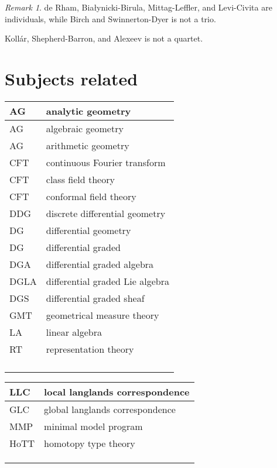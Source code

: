 \documentclass{amsart}
\numberwithin{equation}{section}
\theoremstyle{plain}
\numberwithin{equation}{section}
\theoremstyle{remark}
\newtheorem{remark}[theorem]{Remark}
\begin{document}
\begin{multicols}{2}
\unvbox\ltmcbox




\end{multicols}

\begin{remark}
de Rham, Bia\l{}ynicki-Birula, Mittag-Leffler, and Levi-Civita are individuals, while Birch and Swinnerton-Dyer is not a trio.

Koll\'{a}r, Shepherd-Barron, and Alexeev is not a quartet.
\end{remark}


\section{Subjects related}

\begin{longtable}{l|l}
\hline
AG & analytic geometry \\ \hline
AG & algebraic geometry \\ \hline
AG & arithmetic geometry \\ \hline
CFT  & continuous Fourier transform\\ \hline
CFT & class field theory\\ \hline
CFT & conformal field theory\\ \hline
DDG & discrete differential geometry\\ \hline
DG & differential geometry\\ \hline
DG & differential graded\\ \hline
DGA & differential graded algebra\\ \hline
DGLA & differential graded Lie algebra\\ \hline
DGS & differential graded sheaf\\ \hline
GMT  & geometrical measure theory\\ \hline
LA & linear algebra  \\ \hline
RT & representation theory\\ \hline
 & \\ \hline
 & \\ \hline
 & \\ \hline
 & \\ \hline
\end{longtable}

\begin{longtable}{l|l}
\hline
LLC & local langlands correspondence \\ \hline
GLC & global langlands correspondence  \\ \hline
MMP & minimal model program\\ \hline
HoTT & homotopy type theory\\ \hline
 & \\ \hline
 & \\ \hline
 & \\ \hline
\end{longtable}
\end{document}
